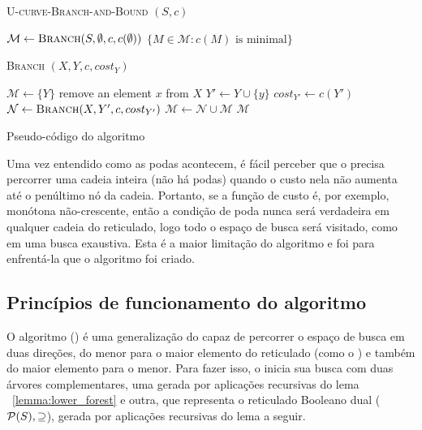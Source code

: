 \begin{algorithm}[!ht]
\textsc{U-curve-Branch-and-Bound} $(S, c)$
\begin{algorithmic}[1]
    \State $\mathcal{M} \gets {\normalfont\textsc{Branch}} (S, \emptyset, c, c (\emptyset))$
    \Return $\{M \in \mathcal{M} : c (M) \text{ is minimal}\}$
\end{algorithmic}
\vspace{1em}

\textsc{Branch} $(X, Y, c, cost_Y)$
\begin{algorithmic}[1]
    \State $\mathcal{M} \gets \{Y\}$
        \State remove an element $x$ from $X$
        \State $Y' \gets Y \cup \{y\}$
        \State $cost_{Y'} \gets c (Y')$
            \State $\mathcal{N} \gets {\normalfont\textsc{Branch}} (X, Y', c, cost_{Y'})$
            \State $\mathcal{M} \gets \mathcal{N} \cup \mathcal{M}$
        \EndIf
    \EndWhile
    \Return $\mathcal{M}$
\end{algorithmic}
\caption{Pseudo-código do algoritmo }
\label{pfs:code:ubb}
\end{algorithm}

Uma vez entendido como as podas acontecem, é fácil perceber que o 
 precisa percorrer uma cadeia inteira (não há podas) quando
o custo nela não aumenta até o penúltimo nó da cadeia. Portanto, se a 
função de custo é, por exemplo, monótona não-crescente, então a condição
de poda nunca será verdadeira em qualquer cadeia do reticulado, logo 
todo o espaço de busca será visitado, como em uma busca exaustiva. Esta
é a maior limitação do algoritmo  e foi para enfrentá-la 
que o algoritmo  foi criado.

\subsection{Princípios de funcionamento do algoritmo }
O algoritmo  () é uma 
generalização do  capaz de percorrer o espaço de busca em
duas direções, do menor para o maior elemento do reticulado 
(como o ) e também do maior elemento para o menor. 
Para fazer isso, o  inicia sua busca com duas árvores 
complementares, uma gerada por 
aplicações recursivas do lema ~\ref{lemma:lower_forest} e outra, que 
representa o reticulado Booleano dual ($\mathcal{P} (S), \supseteq$), 
gerada por aplicações recursivas do lema a seguir.

